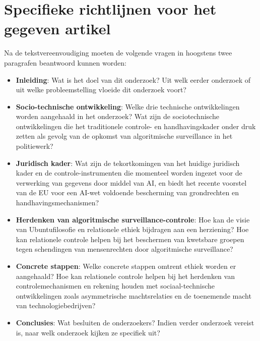 \documentclass{report}
\begin{document}
	\chapter{Specifieke richtlijnen voor het gegeven artikel}
	Na de tekstvereenvoudiging moeten de volgende vragen in hoogstens twee paragrafen beantwoord kunnen worden:
	\begin{itemize}
		\item \textbf{Inleiding}: Wat is het doel van dit onderzoek? Uit welk eerder onderzoek of uit welke probleemstelling vloeide dit onderzoek voort?
		\item \textbf{Socio-technische ontwikkeling}: Welke drie technische ontwikkelingen worden aangehaald in het onderzoek? Wat zijn de sociotechnische ontwikkelingen die het traditionele controle- en handhavingskader onder druk zetten als gevolg van de opkomst van algoritmische surveillance in het politiewerk?
		\item \textbf{Juridisch kader}: Wat zijn de tekortkomingen van het huidige juridisch kader en de controle-instrumenten die momenteel worden ingezet voor de verwerking van gegevens door middel van AI, en biedt het recente voorstel van de EU voor een AI-wet voldoende bescherming van grondrechten en handhavingsmechanismen?
		\item \textbf{Herdenken van algoritmische surveillance-controle}: Hoe kan de visie van Ubuntufilosofie en relationele ethiek bijdragen aan een herziening? Hoe kan relationele controle helpen bij het beschermen van kwetsbare groepen tegen schendingen van mensenrechten door algoritmische surveillance?
		\item \textbf{Concrete stappen}: Welke concrete stappen omtrent ethiek worden er aangehaald? Hoe kan relationele controle helpen bij het herdenken van controlemechanismen en rekening houden met sociaal-technische ontwikkelingen zoals asymmetrische machtsrelaties en de toenemende macht van technologiebedrijven?
		\item \textbf{Conclusies}: Wat besluiten de onderzoekers? Indien verder onderzoek vereist is, naar welk onderzoek kijken ze specifiek uit?
	\end{itemize} 
\end{document}
